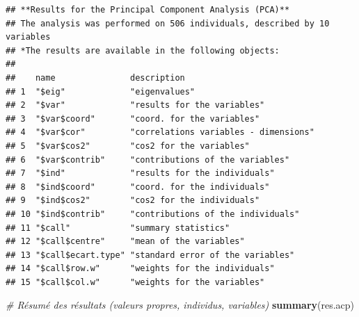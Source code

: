 \documentclass[
  11pt,
  french,
]{book}
\makeatletter
\newenvironment{Shaded}{\begin{snugshade}}{\end{snugshade}}
\newcommand{\CommentTok}[1]{\textcolor[rgb]{0.56,0.35,0.01}{\textit{#1}}}
\newcommand{\KeywordTok}[1]{\textcolor[rgb]{0.13,0.29,0.53}{\textbf{#1}}}
\newcommand{\NormalTok}[1]{#1}
\newenvironment{kframe}{%
\medskip{}
\setlength{\fboxsep}{.8em}
 \def\at@end@of@kframe{}%
 \ifinner\ifhmode%
  \def\at@end@of@kframe{\end{minipage}}%
  \begin{minipage}{\columnwidth}%
 \fi\fi%
 \def\FrameCommand##1{\hskip\@totalleftmargin \hskip-\fboxsep
 \colorbox{shadecolor}{##1}\hskip-\fboxsep
     \hskip-\linewidth \hskip-\@totalleftmargin \hskip\columnwidth}%
 \MakeFramed {\advance\hsize-\width
   \@totalleftmargin\z@ \linewidth\hsize
   \@setminipage}}%
 {\par\unskip\endMakeFramed%
 \at@end@of@kframe}
\renewenvironment{Shaded}{\begin{kframe}}{\end{kframe}}
\makeatother
\begin{document}
\begin{verbatim}
## **Results for the Principal Component Analysis (PCA)**
## The analysis was performed on 506 individuals, described by 10 variables
## *The results are available in the following objects:
## 
##    name               description                          
## 1  "$eig"             "eigenvalues"                        
## 2  "$var"             "results for the variables"          
## 3  "$var$coord"       "coord. for the variables"           
## 4  "$var$cor"         "correlations variables - dimensions"
## 5  "$var$cos2"        "cos2 for the variables"             
## 6  "$var$contrib"     "contributions of the variables"     
## 7  "$ind"             "results for the individuals"        
## 8  "$ind$coord"       "coord. for the individuals"         
## 9  "$ind$cos2"        "cos2 for the individuals"           
## 10 "$ind$contrib"     "contributions of the individuals"   
## 11 "$call"            "summary statistics"                 
## 12 "$call$centre"     "mean of the variables"              
## 13 "$call$ecart.type" "standard error of the variables"    
## 14 "$call$row.w"      "weights for the individuals"        
## 15 "$call$col.w"      "weights for the variables"
\end{verbatim}

\begin{Shaded}
\begin{Highlighting}[]
\CommentTok{# Résumé des résultats (valeurs propres, individus, variables)}
\KeywordTok{summary}\NormalTok{(res.acp)}
\end{Highlighting}
\end{Shaded}
\end{document}
